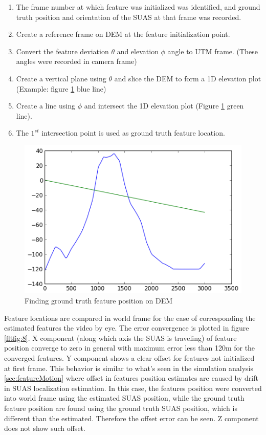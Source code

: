 \begin{enumerate}
  \item The frame number at which feature was initialized was
  identified, and ground truth position and orientation of the SUAS at
  that frame was recorded.
  \item Create a reference frame on DEM at the feature initialization point.
  \item Convert the feature deviation $\theta$ and elevation $\phi$
  angle to UTM frame. (These angles were recorded in camera frame)
  \item Create a vertical plane using $\theta$ and slice the DEM to
  form a 1D elevation plot (Example: figure \ref{fltfig:7} blue line)
  \item Create a line using $\phi$ and intersect the 1D elevation plot
  (Figure \ref{fltfig:7} green line). 
  \item The $1^{st}$ intersection point is used as ground truth
  feature location.
\end{enumerate}

\begin{figure}[h]
\centering
\includegraphics[width=12cm, keepaspectratio=true]
{./Figures/fltfig/cut1/intersect0_0.png}
\caption{Finding ground truth feature position on DEM}
\label{fltfig:7}
\end{figure}

Feature locations are compared in world frame for the ease of
corresponding the estimated features the video by eye. The error
convergence is plotted in figure \ref{fltfig:8}. X component (along
which axis the SUAS is traveling) of feature position converge to zero
in general with maximum error less than 120m for the converged
features. Y component shows a clear offset for features not
initialized at first frame. This behavior is similar to what's seen in
the simulation analysis \ref{sec:featureMotion} where offset in
features position estimates are caused by drift in SUAS localization
estimation. In this case, the features position were converted into
world frame using the estimated SUAS position, while the ground truth
feature position are found using the ground truth SUAS position, which
is different than the estimated. Therefore the offset error can be
seen. Z component does not show such offset.


